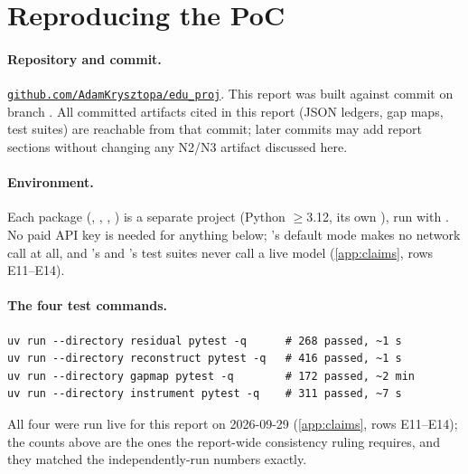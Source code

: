 \section{Reproducing the PoC}
\label{app:reproduce}

\paragraph{Repository and commit.} \href{https://github.com/AdamKrysztopa/edu_proj}{\nolinkurl{github.com/AdamKrysztopa/edu_proj}}.
This report was built against commit  on branch . All committed artifacts
cited in this report (JSON ledgers, gap maps, test suites) are reachable from that commit; later
commits may add report sections without changing any N2/N3 artifact discussed here.

\paragraph{Environment.} Each package (, , ,
) is a separate  project (Python \(\geq\)3.12, its own
), run with . No paid API key is
needed for anything below; 's default mode makes no network call at all, and
's and 's test suites never call a live model
(\cref{app:claims}, rows E11--E14).

\paragraph{The four test commands.}
\begin{verbatim}
uv run --directory residual pytest -q      # 268 passed, ~1 s
uv run --directory reconstruct pytest -q   # 416 passed, ~1 s
uv run --directory gapmap pytest -q        # 172 passed, ~2 min
uv run --directory instrument pytest -q    # 311 passed, ~7 s
\end{verbatim}
All four were run live for this report on 2026-09-29 (\cref{app:claims}, rows E11--E14); the
counts above are the ones the report-wide consistency ruling requires, and they matched the
independently-run numbers exactly.

